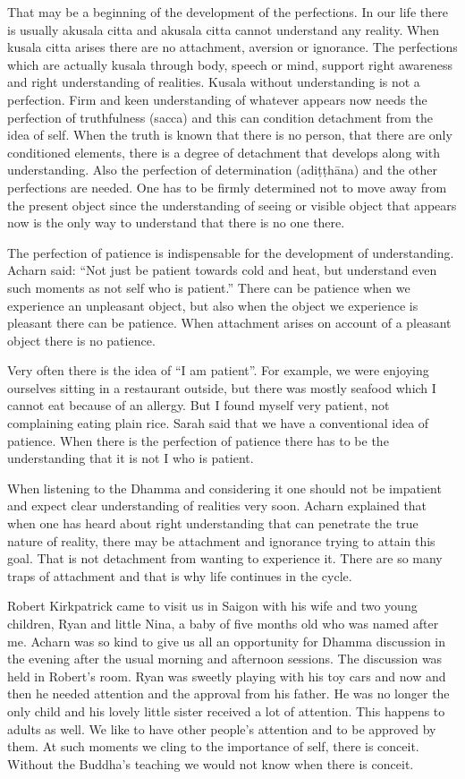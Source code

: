 That may be a beginning of the development of the perfections. In our
life there is usually akusala citta and akusala citta cannot understand
any reality. When kusala citta arises there are no attachment, aversion
or ignorance. The perfections which are actually kusala through body,
speech or mind, support right awareness and right understanding of
realities. Kusala without understanding is not a perfection. Firm and
keen understanding of whatever appears now needs the perfection of
truthfulness (sacca) and this can condition detachment from the idea of
self. When the truth is known that there is no person, that there are
only conditioned elements, there is a degree of detachment that develops
along with understanding. Also the perfection of determination
(adiṭṭhāna) and the other perfections are needed. One has to be firmly
determined not to move away from the present object since the
understanding of seeing or visible object that appears now is the only
way to understand that there is no one there.

The perfection of patience is indispensable for the development of
understanding. Acharn said: ``Not just be patient towards cold and heat,
but understand even such moments as not self who is patient.'' There can
be patience when we experience an unpleasant object, but also when the
object we experience is pleasant there can be patience. When attachment
arises on account of a pleasant object there is no patience.

Very often there is the idea of ``I am patient''. For example, we were
enjoying ourselves sitting in a restaurant outside, but there was mostly
seafood which I cannot eat because of an allergy. But I found myself
very patient, not complaining eating plain rice. Sarah said that we have
a conventional idea of patience. When there is the perfection of
patience there has to be the understanding that it is not I who is
patient.

When listening to the Dhamma and considering it one should not be
impatient and expect clear understanding of realities very soon. Acharn
explained that when one has heard about right understanding that can
penetrate the true nature of reality, there may be attachment and
ignorance trying to attain this goal. That is not detachment from
wanting to experience it. There are so many traps of attachment and that
is why life continues in the cycle.

Robert Kirkpatrick came to visit us in Saigon with his wife and two
young children, Ryan and little Nina, a baby of five months old who was
named after me. Acharn was so kind to give us all an opportunity for
Dhamma discussion in the evening after the usual morning and afternoon
sessions. The discussion was held in Robert's room. Ryan was sweetly
playing with his toy cars and now and then he needed attention and the
approval from his father. He was no longer the only child and his lovely
little sister received a lot of attention. This happens to adults as
well. We like to have other people's attention and to be approved by
them. At such moments we cling to the importance of self, there is
conceit. Without the Buddha's teaching we would not know when there is
conceit.


